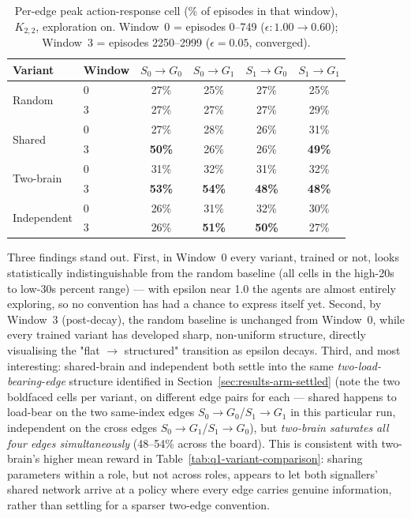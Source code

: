 \documentclass[a4paper,twoside,12pt]{report}
\begin{document}
\begin{table}[H]
\centering
\caption{Per-edge peak action-response cell (\% of episodes in that window),
$K_{2,2}$, exploration on. Window~0 = episodes 0--749 ($\epsilon:
1.00\!\to\!0.60$); Window~3 = episodes 2250--2999 ($\epsilon = 0.05$,
converged).}
\label{tab:q1-arm-windowed}
\renewcommand{\arraystretch}{1.2}
\begin{tabular}{l l cccc}
\toprule
\textbf{Variant} & \textbf{Window} & $S_0\!\to\!G_0$ & $S_0\!\to\!G_1$ & $S_1\!\to\!G_0$ & $S_1\!\to\!G_1$ \\
\midrule
\multirow{2}{*}{Random}      & 0 & 27\% & 25\% & 27\% & 25\% \\
                              & 3 & 27\% & 27\% & 27\% & 29\% \\
\multirow{2}{*}{Shared}      & 0 & 27\% & 28\% & 26\% & 31\% \\
                              & 3 & \textbf{50\%} & 26\% & 26\% & \textbf{49\%} \\
\multirow{2}{*}{Two-brain}   & 0 & 31\% & 32\% & 31\% & 32\% \\
                              & 3 & \textbf{53\%} & \textbf{54\%} & \textbf{48\%} & \textbf{48\%} \\
\multirow{2}{*}{Independent} & 0 & 26\% & 31\% & 32\% & 30\% \\
                              & 3 & 26\% & \textbf{51\%} & \textbf{50\%} & 27\% \\
\bottomrule
\end{tabular}
\end{table}

Three findings stand out. First, in Window~0 every variant, trained or not,
looks statistically indistinguishable from the random baseline (all cells in
the high-20s to low-30s percent range) --- with epsilon near 1.0 the agents
are almost entirely exploring, so no convention has had a chance to express
itself yet. Second, by Window~3 (post-decay), the random baseline is
unchanged from Window~0, while every trained variant has developed sharp,
non-uniform structure, directly visualising the "flat $\to$ structured"
transition as epsilon decays. Third, and most interesting: shared-brain and
independent both settle into the same \emph{two-load-bearing-edge} structure
identified in Section~\ref{sec:results-arm-settled} (note the two boldfaced
cells per variant, on different edge pairs for each --- shared happens to
load-bear on the two same-index edges $S_0\!\to\!G_0$/$S_1\!\to\!G_1$ in this
particular run, independent on the cross edges $S_0\!\to\!G_1$/$S_1\!\to\!G_0$),
but \emph{two-brain saturates all four edges simultaneously} (48--54\%
across the board). This is consistent with two-brain's higher mean reward in
Table~\ref{tab:q1-variant-comparison}: sharing parameters within a role, but
not across roles, appears to let both signallers' shared network arrive at a
policy where every edge carries genuine information, rather than settling for
a sparser two-edge convention.
\end{document}
